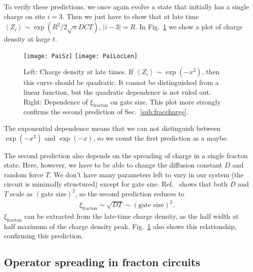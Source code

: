 \documentclass[a4paper,11pt]{article}
\newcommand{\ex}[1]{\left\langle #1 \right\rangle}
\begin{document}
To verify these predictions, we once again evolve a state that initially has a single charge on site $i=3$. Then we just have to show that at late time $\ex{Z_i}\sim\exp(R^2/2\sqrt{\pi}DCT)$, $|i-3|=R$. 
In Fig.~\ref{fig:PaiSz} we show a plot of charge density at large $t$. 
\begin{figure}
	\centering
	\texttt{[image: PaiSz]}
	\texttt{[image: PaiLocLen]}
	\caption{Left: Charge density at late times. If $\ex{Z_i}\sim\exp(-x^2)$, then this curve should be quadratic. It cannot be distinguished from a linear function, but the quadratic dependence is not ruled out. Right: Dependence of $\xi_\text{fracton}$ on gate size. This plot more strongly confirms the second prediction of Sec.~\ref{sub:fraccharge}.}
	\label{fig:PaiSz}
\end{figure}
The exponential dependence means that we can not distinguish between $\exp(-x^2)$ and $\exp(-x)$, so we count the first prediction as a maybe. 

The second prediction also depends on the spreading of charge in a single fracton state. Here, however, we have to be able to change the diffusion constant $D$ and random force $T$. We don't have many parameters left to vary in our system (the circuit is minimally structured) except for gate size. Ref.~\cite{PaiFracton} shows that both $D$ and $T$ scale as $(\text{gate size})^2$, so the second prediction reduces to
\begin{align}
\xi_\text{fracton}\sim\sqrt{DT}\sim(\text{gate size})^2.
\end{align}
$\xi_\text{fracton}$ can be extracted from the late-time charge density, as the half width at half maximum of the charge density peak.
Fig.~\ref{fig:PaiSz} also shows this relationship, confirming this prediction.

\subsection{Operator spreading in fracton circuits} \label{sub:fracopsp}
\end{document}
